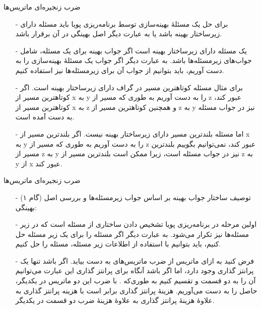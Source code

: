 \begin{frame}{‌ضرب زنجیره‌ای ماتریس‌ها}
\begin{itemize}\itemr
\item[-]
برای حل یک مسئلهٔ بهینه‌سازی توسط برنامه‌ریزی پویا باید مسئله دارای زیرساختار بهینه
 باشد یا به عبارت دیگر اصل بهینگی
  در آن برقرار باشد.
\item[-]
یک مسئله دارای زیرساختار بهینه است اگر جواب بهینه برای یک مسئله، شامل جواب‌های زیرمسئله‌ها باشد. به عبارت دیگر اگر جواب یک مسئلهٔ بهینه‌سازی را به دست آوریم، باید بتوانیم از جواب آن برای زیرمسئله‌ها نیز استفاده کنیم.
\item[-]
برای مثال مسئله کوتاهترین مسیر در گراف دارای زیرساختار بهینه است.
اگر کوتاهترین مسیر از x به y را به دست آوریم به طوری که مسیر از z عبور کند، کوتاهترین مسیر از x به z  و همچنین کوتاهترین مسیر از z به y نیز در جواب مسئله به دست آمده است.
\item[-]
اما مسئله بلندترین مسیر دارای زیرساختار بهینه نیست.
اگر بلندترین مسیر از x به y را به دست آوریم به طوری که مسیر از z عبور کند، نمی‌توانیم بگوییم بلندترین مسیر از z به y نیز در جواب مسئله است، زیرا ممکن است بلندترین مسیر از z به y از x عبور کند.
\end{itemize}
\end{frame}


\begin{frame}{‌ضرب زنجیره‌ای ماتریس‌ها}
\begin{itemize}\itemr
\item[-]
(گام ۱) توصیف ساختار جواب بهینه بر اساس جواب زیرمسئله‌ها و بررسی اصل بهینگی:
\item[-]
اولین مرحله در برنامه‌ریزی پویا تشخیص دادن ساختاری از مسئله است که در زیر مسئله‌ها نیز تکرار می‌شود. به عبارت دیگر اگر مسئله را برای یک زیر مسئله حل کنیم، باید بتوانیم با استفاده از اطلاعات زیر مسئله، مسئله را حل کنیم.
\item[-]
فرض کنید به ازای
ماتریس
از ضرب ماتریس‌های
به دست بیاید. اگر
باشد تنها یک پرانتز گذاری وجود دارد، اما اگر
باشد آنگاه برای پرانتز گذاری این عبارت می‌توانیم آن را به دو قسمت
و
تقسیم کنیم به طوری‌که
 .
با ضرب این دو ماتریس در یکدیگر، حاصل
را به دست می‌آوریم.
هزینهٔ پرانتز گذاری
برابر است با هزینه پرانتز گذاری
به علاوهٔ هزینهٔ پرانتز گذاری
به علاوهٔ هزینهٔ ضرب دو قسمت در یکدیگر.
\end{itemize}
\end{frame}


